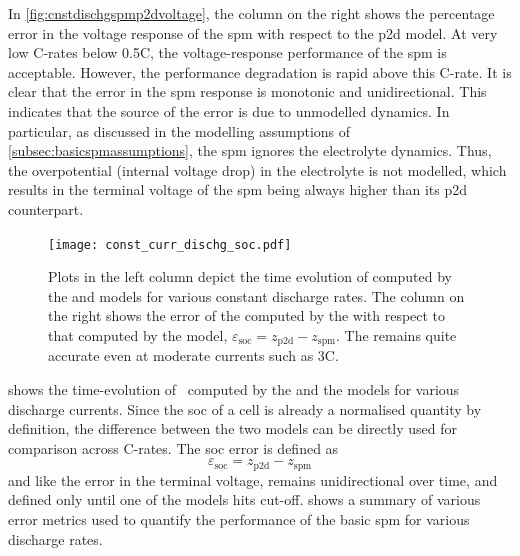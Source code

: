 In \cref{fig:cnstdischgspmp2dvoltage},  the  column  on   the  right  shows  the
percentage error  in the voltage response  of the \gls{spm} with  respect to the
\gls{p2d} model.  At very  low C-rates  below \approx0.5C,  the voltage-response
performance of the \gls{spm} is acceptable. However, the performance degradation
is rapid above this C-rate. It is clear that the error in the \gls{spm} response
is monotonic and unidirectional. This indicates  that the source of the error is
due  to  unmodelled dynamics.  In  particular,  as  discussed in  the  modelling
assumptions  of \cref{subsec:basicspmassumptions},  the  \gls{spm}  ignores  the
electrolyte dynamics.  Thus, the  overpotential (internal  voltage drop)  in the
electrolyte  is not  modelled,  which results  in the  terminal  voltage of  the
\gls{spm} being always higher than its \gls{p2d} counterpart.

\begin{figure}[!htbp]
    \centering
    \texttt{[image: const\_curr\_dischg\_soc.pdf]}
    \caption[ computed by  and
     models for constant current discharge]{Plots in the left
        column depict the time evolution of  computed by the
         and  models for various constant
        discharge rates. The column on the right shows the error of the
         computed by the  with respect to that
        computed by the  model, \ie{} $ \varepsilon_\text{soc}
        = {z_\text{p2d}} - z_\text{spm} $. The  remains quite
    accurate even at moderate currents such as 3C.}
    \label{fig:cnstdischgspmp2dsoc}
\end{figure}

  shows  the  time-evolution  of~
computed by the   and the   models for various
discharge  currents. Since  the  \gls{soc} of  a cell  is  already a  normalised
quantity by  definition, the difference between  the two models can  be directly
used for comparison across C-rates. The \gls{soc} error is defined as
\begin{equation}
    \varepsilon_\text{soc} = {z_\text{p2d}} - z_\text{spm}
\end{equation}
and   like  the   error  in   the  terminal   voltage,  remains   unidirectional
over  time,   and  defined  only   until  one   of  the  models   hits  cut-off.
  shows  a  summary of  various  error
metrics used  to quantify  the performance  of the  basic \gls{spm}  for various
discharge rates.

